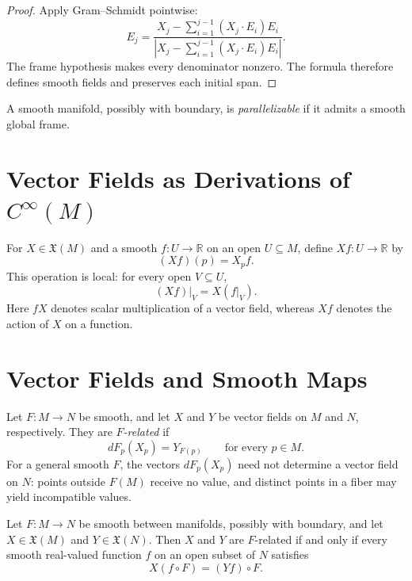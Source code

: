 \begin{proof}
\leanok
\sketch Apply Gram--Schmidt pointwise:
\[
E_j=\frac{X_j-\sum_{i=1}^{j-1}(X_j\cdot E_i)E_i}
{\left|X_j-\sum_{i=1}^{j-1}(X_j\cdot E_i)E_i\right|}.
\]
The frame hypothesis makes every denominator nonzero. The formula therefore
defines smooth fields and preserves each initial span.
\end{proof}

\begin{definition}
\label{def:8-55-extra-3}
\leanok
A smooth manifold, possibly with boundary, is \emph{parallelizable} if it
admits a smooth global frame.
\end{definition}

\section{Vector Fields as Derivations of $C^\infty(M)$}

\begin{notation}
\label{not:8-56-extra-1}
\leanok
For $X\in\mathfrak{X}(M)$ and a smooth $f\colon U\to\mathbb{R}$ on an open
$U\subseteq M$, define $Xf\colon U\to\mathbb{R}$ by
\[
(Xf)(p)=X_pf.
\]
This operation is local: for every open $V\subseteq U$,
\[
(Xf)|_V=X(f|_V). \tag{8.4}
\]
Here $fX$ denotes scalar multiplication of a vector field, whereas $Xf$
denotes the action of $X$ on a function.
\end{notation}

\section{Vector Fields and Smooth Maps}

\begin{definition}
\label{def:8-57-extra-1}
\leanok
Let $F\colon M\to N$ be smooth, and let $X$ and $Y$ be vector fields on $M$
and $N$, respectively. They are \emph{$F$-related} if
\[
dF_p(X_p)=Y_{F(p)}
\qquad\text{for every }p\in M.
\]
For a general smooth $F$, the vectors $dF_p(X_p)$ need not determine a vector
field on $N$: points outside $F(M)$ receive no value, and distinct points in a
fiber may yield incompatible values.
\end{definition}

\begin{proposition}
\label{prop:8-16}
\leanok
{}
Let $F\colon M\to N$ be smooth between manifolds, possibly with boundary, and
let $X\in\mathfrak{X}(M)$ and $Y\in\mathfrak{X}(N)$. Then $X$ and $Y$ are
$F$-related if and only if every smooth real-valued function $f$ on an open
subset of $N$ satisfies
\[
X(f\circ F)=(Yf)\circ F. \tag{8.6}
\]
\end{proposition}

